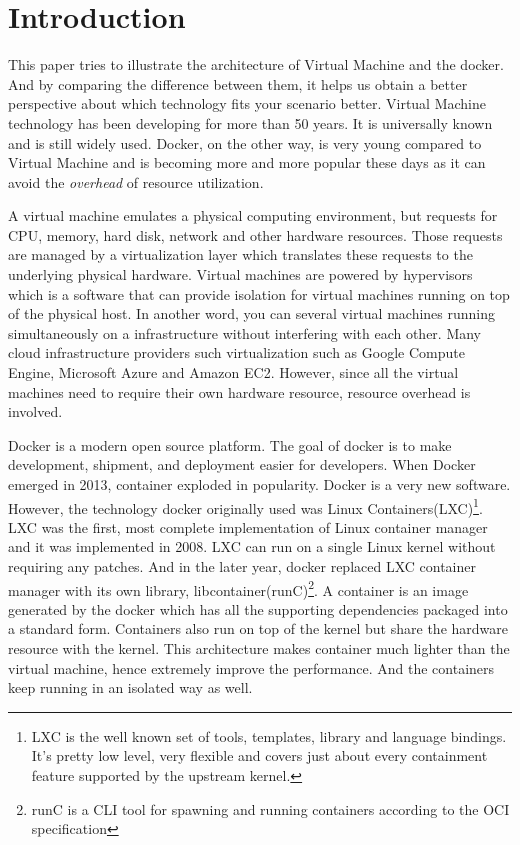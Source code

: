 \documentclass{sig-alternate}
\begin{document}




\section{Introduction}
This paper tries to illustrate the architecture of Virtual Machine and the docker. And by comparing the difference between them, it helps us obtain a better perspective about which technology fits your scenario better. Virtual Machine technology has been developing for more than 50 years. It is universally known and is still widely used. Docker, on the other way, is very young compared to Virtual Machine and is becoming more and more popular these days as it can avoid the \textit{overhead} of resource utilization.

A virtual machine emulates a physical computing environment, but requests for CPU, memory, hard disk, network and other hardware resources. Those requests are managed by a virtualization layer which translates these requests to the underlying physical hardware. Virtual machines are powered by hypervisors which is a software that can provide isolation for virtual machines running on top of the physical host. In another word, you can several virtual machines running simultaneously on a infrastructure without interfering with each other. Many cloud infrastructure providers such virtualization such as Google Compute Engine, Microsoft Azure and Amazon EC2. However, since all the virtual machines need to require their own hardware resource, resource overhead is involved. 

Docker is a modern open source platform. The goal of docker is to make development, shipment, and deployment easier for developers. When Docker emerged in 2013, container exploded in popularity. Docker is a very new software. However, the technology docker originally used was Linux Containers(LXC)\footnote{LXC is the well known set of tools, templates, library and language bindings. It's pretty low level, very flexible and covers just about every containment feature supported by the upstream kernel.}. LXC was the first, most complete implementation of Linux container manager and it was implemented in 2008. LXC can run on a single Linux kernel without requiring any patches. And in the later year, docker replaced LXC container manager with its own library, libcontainer(runC)\footnote{runC is a CLI tool for spawning and running containers according to the OCI specification}. A container is an image generated by the docker which has all the supporting dependencies packaged into a standard form. Containers also run on top of the kernel but share the hardware resource with the kernel. This architecture makes container much lighter than the virtual machine, hence extremely improve the performance. And the containers keep running in an isolated way as well.
\end{document}
